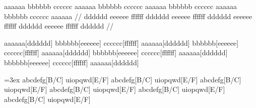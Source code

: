 

\hsize=3in

\ex
\begingl[glstyle=wrap,glhangindent=0pt,glneveryline=\strut]
\gla aaaaaa bbbbbb cccccc aaaaaa bbbbbb cccccc aaaaaa bbbbbb cccccc
   aaaaaa bbbbbb cccccc aaaaaa //
\glb dddddd eeeeee ffffff dddddd eeeeee ffffff dddddd eeeeee ffffff
dddddd eeeeee ffffff dddddd //
\endgl
\xe

\ex
\begingl[glstyle=nlevel]
aaaaaa[dddddd] bbbbbb[eeeeee] cccccc[ffffff]
aaaaaa[dddddd] bbbbbb[eeeeee] cccccc[ffffff]
aaaaaa[dddddd] bbbbbb[eeeeee] cccccc[ffffff]
aaaaaa[dddddd] bbbbbb[eeeeee] cccccc[ffffff]
aaaaaa[dddddd]
\endilg
\endgl
\xe


\ex
\lineskip=3ex
\begingl[glstyle=nlevel,glspace=2em,
   everygl=\advance\baselineskip by 2ex]
abcdefg[B/C]
uiopqwd[E/F]
abcdefg[B/C]
uiopqwd[E/F]
abcdefg[B/C]
uiopqwd[E/F]
abcdefg[B/C]
uiopqwd[E/F]
abcdefg[B/C]
uiopqwd[E/F]
abcdefg[B/C]
uiopqwd[E/F]
\endilg
\endgl
\xe

